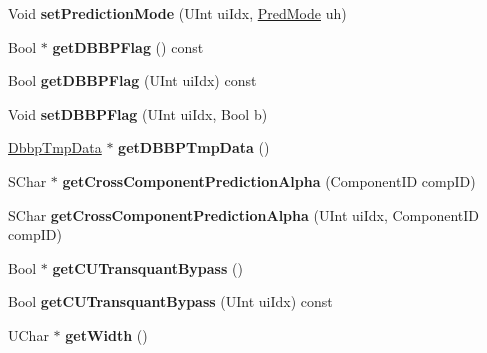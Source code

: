 \begin{DoxyCompactItemize}
Void {\bfseries set\+Prediction\+Mode} (U\+Int ui\+Idx, \hyperlink{_type_def_8h_a33d1666f1cc95252c96e39584255954e}{Pred\+Mode} uh)
\item 
\mbox{\label{class_t_com_data_c_u_a0a8388463df2348866051018f9fab5f7}} 
Bool $\ast$ {\bfseries get\+D\+B\+B\+P\+Flag} () const
\item 
\mbox{\label{class_t_com_data_c_u_ac9ea4ac78668e9441d8c17af437489a9}} 
Bool {\bfseries get\+D\+B\+B\+P\+Flag} (U\+Int ui\+Idx) const
\item 
\mbox{\label{class_t_com_data_c_u_aebf0cfa8e5e2f713546616c9f1214845}} 
Void {\bfseries set\+D\+B\+B\+P\+Flag} (U\+Int ui\+Idx, Bool b)
\item 
\mbox{\label{class_t_com_data_c_u_ac71b6caef3912380e3236400eb8cc612}} 
\hyperlink{struct___d_b_b_p_tmp_data}{Dbbp\+Tmp\+Data} $\ast$ {\bfseries get\+D\+B\+B\+P\+Tmp\+Data} ()
\item 
\mbox{\label{class_t_com_data_c_u_a311bb9bd77712e25a49acf0262969102}} 
S\+Char $\ast$ {\bfseries get\+Cross\+Component\+Prediction\+Alpha} (Component\+ID comp\+ID)
\item 
\mbox{\label{class_t_com_data_c_u_abf77af307946bb52a2fea6d34ec9b8b3}} 
S\+Char {\bfseries get\+Cross\+Component\+Prediction\+Alpha} (U\+Int ui\+Idx, Component\+ID comp\+ID)
\item 
\mbox{\label{class_t_com_data_c_u_a081cd0a24b1e95709f27eb09cf016ae7}} 
Bool $\ast$ {\bfseries get\+C\+U\+Transquant\+Bypass} ()
\item 
\mbox{\label{class_t_com_data_c_u_a9693390963aa8e41fcfc39be9f5990fb}} 
Bool {\bfseries get\+C\+U\+Transquant\+Bypass} (U\+Int ui\+Idx) const
\item 
\mbox{\label{class_t_com_data_c_u_aabd545197c2c594acd6627f3e684181d}} 
U\+Char $\ast$ {\bfseries get\+Width} ()
\item 
\mbox{\label{class_t_com_data_c_u_aaff89dddf5bd28a41173db8d370b6799}} 

\end{DoxyCompactItemize}
